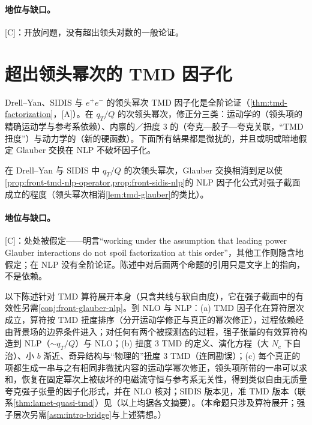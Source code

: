 \paragraph{地位与缺口。}[C]：开放问题，没有超出领头对数的一般论证。

\section{超出领头幂次的 TMD 因子化}\label{sec:front-nlp-tmd}

Drell--Yan、SIDIS 与 $e^+e^-$ 的领头幂次 TMD 因子化是全阶论证（\cref{thm:tmd-factorization}，[A]）。在 $q_T/Q$ 的次领头幂次，修正分三类：运动学的（领头项的精确运动学与参考系依赖）、内禀的／扭度 3 的（夸克—胶子—夸克关联，“TMD 扭度”）与动力学的（新的硬函数）。下面所有结果都是微扰的，并且或明或暗地假定 Glauber 交换在 NLP 不破坏因子化。

\begin{conjecture}\label{conj:front-glauber-nlp}
在 Drell--Yan 与 SIDIS 中 $q_T/Q$ 的次领头幂次，Glauber 交换相消到足以使\cref{prop:front-tmd-nlp-operator,prop:front-sidis-nlp}的 NLP 因子化公式对强子截面成立的程度（领头幂次相消\cref{lem:tmd-glauber}的类比）。
\end{conjecture}

\paragraph{地位与缺口。}[C]：处处被假定——\cite{Ebert:2021jhy}明言“working under the assumption that leading power Glauber interactions do not spoil factorization at this order”，其他工作则隐含地假定；在 NLP 没有全阶论证。陈述中对后面两个命题的引用只是文字上的指向，不是依赖。

\begin{proposition}\label{prop:front-tmd-nlp-operator}
以下陈述针对 TMD 算符展开本身（只含共线与软自由度），它在强子截面中的有效性另需\cref{conj:front-glauber-nlp}。到 NLO 与 NLP：(a) TMD 因子化在算符层次成立，算符按 TMD 扭度排序（分开运动学修正与真正的幂次修正），过程依赖经由背景场的边界条件进入；对任何有两个被探测态的过程，强子张量的有效算符构造到 NLP（$\sim q_T/Q$）与 NLO\cite{Vladimirov:2021hdn}；(b) 扭度 3 TMD 的定义、演化方程（大 $N_c$ 下自治）、小 $b$ 渐近、奇异结构与“物理的”扭度 3 TMD\cite{Rodini:2022wki}（连同勘误）；(c) 每个真正的项都生成一串与之有相同非微扰内容的运动学幂次修正，领头项所带的一串可以求和，恢复在固定幂次上被破坏的电磁流守恒与参考系无关性，得到类似自由无质量夸克强子张量的因子化形式，并在 NLO 核对\cite{Vladimirov:2023aot}；SIDIS 版本见\cite{Piloneta:2025jjb}，准 TMD 版本（联系\cref{thm:lamet-quasi-tmd}）见\cite{BrisCuerpo:2026pma}（以上均据各文摘要）。（本命题只涉及算符展开；强子层次另需\cref{asm:intro-bridge}与上述猜想。）
\end{proposition}


